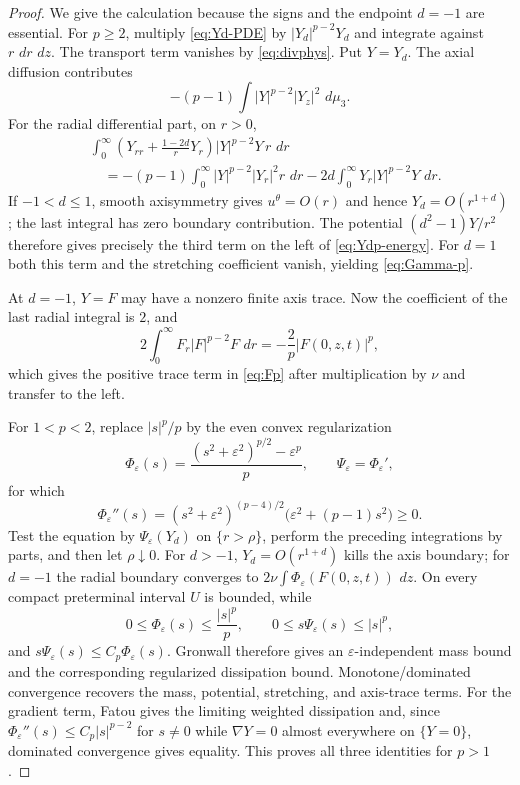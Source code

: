 \documentclass[11pt]{article}
\numberwithin{equation}{section}
\theoremstyle{definition}
\newcommand{\dd}{\,d}
\begin{document}
\begin{proof}
We give the calculation because the signs and the endpoint $d=-1$ are essential.  For $p\ge2$, multiply \eqref{eq:Yd-PDE} by $|Y_d|^{p-2}Y_d$ and integrate against $r\,\dd r\,\dd z$.  The transport term vanishes by \eqref{eq:divphys}.  Put $Y=Y_d$.  The axial diffusion contributes
\[
 -(p-1)\int |Y|^{p-2}|Y_z|^2\,\dd\mu_3.
\]
For the radial differential part, on $r>0$,
\begin{align*}
 &\int_0^\infty
 \left(Y_{rr}+\frac{1-2d}{r}Y_r\right)|Y|^{p-2}Y\,r\,\dd r\\
 &\quad=-(p-1)\int_0^\infty |Y|^{p-2}|Y_r|^2r\,\dd r
 -2d\int_0^\infty Y_r|Y|^{p-2}Y\,\dd r.
\end{align*}
If $-1<d\le1$, smooth axisymmetry gives $u^\theta=O(r)$ and hence $Y_d=O(r^{1+d})$; the last integral has zero boundary contribution.  The potential $(d^2-1)Y/r^2$ therefore gives precisely the third term on the left of \eqref{eq:Ydp-energy}.  For $d=1$ both this term and the stretching coefficient vanish, yielding \eqref{eq:Gamma-p}.

At $d=-1$, $Y=F$ may have a nonzero finite axis trace.  Now the coefficient of the last radial integral is $2$, and
\[
 2\int_0^\infty F_r|F|^{p-2}F\,\dd r
 =-\frac2p|F(0,z,t)|^p,
\]
which gives the positive trace term in \eqref{eq:Fp} after multiplication by $\nu$ and transfer to the left.

For $1<p<2$, replace $|s|^p/p$ by the even convex regularization
\[
 \Phi_\varepsilon(s)
 =\frac{(s^2+\varepsilon^2)^{p/2}-\varepsilon^p}{p},
 \qquad
 \Psi_\varepsilon=\Phi_\varepsilon',
\]
for which
\[
 \Phi_\varepsilon''(s)
 =(s^2+\varepsilon^2)^{(p-4)/2}
 \bigl(\varepsilon^2+(p-1)s^2\bigr)\ge0.
\]
Test the equation by $\Psi_\varepsilon(Y_d)$ on $\{r>\rho\}$, perform the preceding integrations by parts, and then let $\rho\downarrow0$.  For $d>-1$, $Y_d=O(r^{1+d})$ kills the axis boundary; for $d=-1$ the radial boundary converges to $2\nu\int\Phi_\varepsilon(F(0,z,t))\,\dd z$.  On every compact preterminal interval $U$ is bounded, while
\[
 0\le \Phi_\varepsilon(s)\le\frac{|s|^p}{p},
 \qquad
 0\le s\Psi_\varepsilon(s)\le |s|^p,
\]
and $s\Psi_\varepsilon(s)\le C_p\Phi_\varepsilon(s)$.  Gronwall therefore gives an $\varepsilon$-independent mass bound and the corresponding regularized dissipation bound.  Monotone/dominated convergence recovers the mass, potential, stretching, and axis-trace terms.  For the gradient term, Fatou gives the limiting weighted dissipation and, since $\Phi_\varepsilon''(s)\le C_p|s|^{p-2}$ for $s\ne0$ while $\nabla Y=0$ almost everywhere on $\{Y=0\}$, dominated convergence gives equality.  This proves all three identities for $p>1$.
\end{proof}
\end{document}

